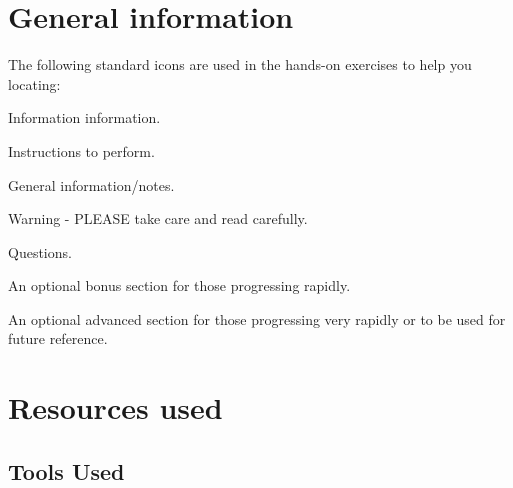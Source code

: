 \documentclass[a4paper,12pt,twoside]{memoir}
\begin{document}
%
%
\workshoptitlepage

\section{General information}

The following standard icons are used in the hands-on exercises to help you locating:

\begin{information}
Information information.

\end{information}

\begin{steps}
Instructions to perform.

\end{steps}

\begin{note}
General information/notes.

\end{note}

\begin{warning}
Warning - PLEASE take care and read carefully.

\end{warning}

\begin{questions}
Questions.

\end{questions}

\begin{bonus}
An optional bonus section for those progressing rapidly.
\end{bonus}

\begin{advanced}
An optional advanced section for those progressing very rapidly or to be used for future reference.
\end{advanced}

\clearpage

\section{Resources used}

\subsection{Tools Used}
\end{document}
